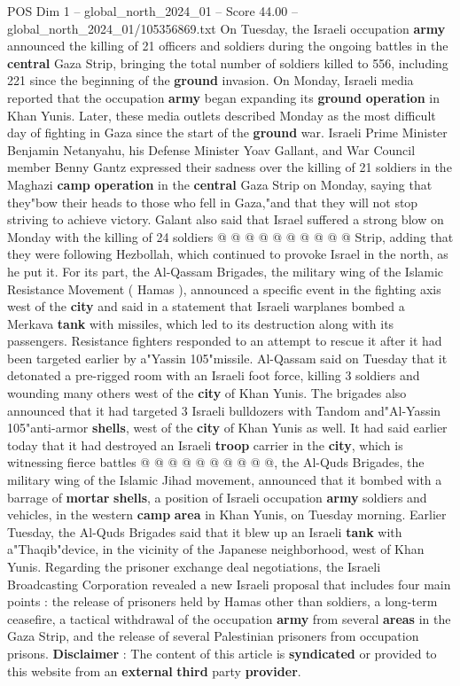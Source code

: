 \begin{textsample}{POS Dim 1 – global\_north\_2024\_01 – Score 44.00 – global\_north\_2024\_01/105356869.txt}
On Tuesday, the Israeli occupation \textbf{army} announced the killing of 21 officers and soldiers during the ongoing battles in the \textbf{central} Gaza Strip, bringing the total number of soldiers killed to 556, including 221 since the beginning of the \textbf{ground} invasion.
On Monday, Israeli media reported that the occupation \textbf{army} began expanding its \textbf{ground} \textbf{operation} in Khan Yunis.
Later, these media outlets described Monday as the most difficult day of fighting in Gaza since the start of the \textbf{ground} war.
Israeli Prime Minister Benjamin Netanyahu, his Defense Minister Yoav Gallant, and War Council member Benny Gantz expressed their sadness over the killing of 21 soldiers in the Maghazi \textbf{camp} \textbf{operation} in the \textbf{central} Gaza Strip on Monday, saying that they"bow their heads to those who fell in Gaza,"and that they will not stop striving to achieve victory.
Galant also said that Israel suffered a strong blow on Monday with the killing of 24 soldiers @ @ @ @ @ @ @ @ @ @ Strip, adding that they were following Hezbollah, which continued to provoke Israel in the north, as he put it.
For its part, the Al-Qassam Brigades, the military wing of the Islamic Resistance Movement ( Hamas ), announced a specific event in the fighting axis west of the \textbf{city} and said in a statement that Israeli warplanes bombed a Merkava \textbf{tank} with missiles, which led to its destruction along with its passengers.
Resistance fighters responded to an attempt to rescue it after it had been targeted earlier by a"Yassin 105"missile.
Al-Qassam said on Tuesday that it detonated a pre-rigged room with an Israeli foot force, killing 3 soldiers and wounding many others west of the \textbf{city} of Khan Yunis.
The brigades also announced that it had targeted 3 Israeli bulldozers with Tandom and"Al-Yassin 105"anti-armor \textbf{shells}, west of the \textbf{city} of Khan Yunis as well.
It had said earlier today that it had destroyed an Israeli \textbf{troop} carrier in the \textbf{city}, which is witnessing fierce battles @ @ @ @ @ @ @ @ @ @, the Al-Quds Brigades, the military wing of the Islamic Jihad movement, announced that it bombed with a barrage of \textbf{mortar} \textbf{shells}, a position of Israeli occupation \textbf{army} soldiers and vehicles, in the western \textbf{camp} \textbf{area} in Khan Yunis, on Tuesday morning.
Earlier Tuesday, the Al-Quds Brigades said that it blew up an Israeli \textbf{tank} with a"Thaqib"device, in the vicinity of the Japanese neighborhood, west of Khan Yunis.
Regarding the prisoner exchange deal negotiations, the Israeli Broadcasting Corporation revealed a new Israeli proposal that includes four main points : the release of prisoners held by Hamas other than soldiers, a long-term ceasefire, a tactical withdrawal of the occupation \textbf{army} from several \textbf{areas} in the Gaza Strip, and the release of several Palestinian prisoners from occupation prisons. \textbf{Disclaimer} : The content of this article is \textbf{syndicated} or provided to this website from an \textbf{external} \textbf{third} party \textbf{provider}.

\end{textsample}

